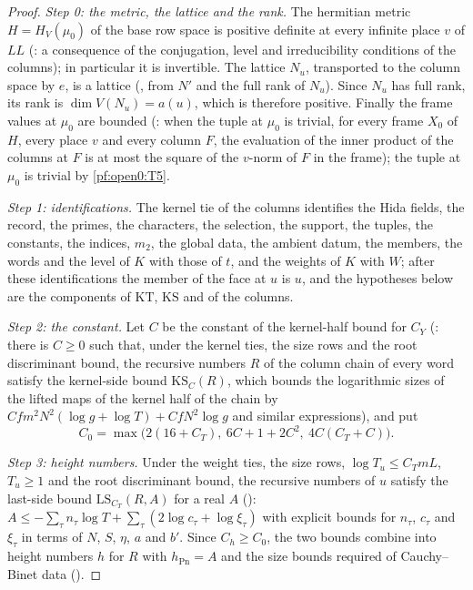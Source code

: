 \begin{proof}
\emph{Step 0: the metric, the lattice and the rank.} The hermitian metric $H=H_V(\mu_0)$ of the base row space is positive
definite at every infinite place $v$ of $\mathit{LL}$ (: a consequence of the
conjugation, level and irreducibility conditions of the columns); in particular it is invertible. The lattice $N_u$, transported
to the column space by $e$, is a lattice (, from $N'$ and the full rank of
$N_u$). Since $N_u$ has full rank, its rank is $\dim V(N_u)=a(u)$, which is therefore positive. Finally the frame values at $\mu_0$ are
bounded (: when the tuple at $\mu_0$ is trivial, for every frame $X_0$ of $H$,
every place $v$ and every column $F$, the evaluation of the inner product of the columns at $F$ is at most the square of the
$v$-norm of $F$ in the frame); the tuple at $\mu_0$ is trivial by \ref{pf:open0:T5}.

\emph{Step 1: identifications.} The kernel tie of the columns identifies the Hida fields, the record, the primes, the characters,
the selection, the support, the tuples, the constants, the indices, $m_2$, the global data, the ambient datum, the members, the
words and the level of $K$ with those of $t$, and the weights of $K$ with $W$; after these identifications the member of the face
at $u$ is $u$, and the hypotheses below are the components of $\mathrm{KT}$, $\mathrm{KS}$ and of the columns.

\emph{Step 2: the constant.} Let $C$ be the constant of the kernel-half bound for $C_Y$
(: there is $C\ge0$ such that, under the kernel ties, the size rows
and the root discriminant bound, the recursive numbers $R$ of the column chain of every word satisfy the kernel-side bound
$\mathrm{KS}_C(R)$, which bounds the logarithmic sizes of the lifted maps of the kernel half of the chain by
$Cfm^2N^2(\log g+\log T)+CfN^2\log g$ and similar expressions), and put
\[
C_0=\max\bigl(2(16+C_T),\ 6C+1+2C^2,\ 4C(C_T+C)\bigr).
\]

\emph{Step 3: height numbers.} Under the weight ties, the size rows, $\log T_u\le C_TmL$, $T_u\ge1$ and the root discriminant bound,
the recursive numbers of $u$ satisfy the last-side bound $\mathrm{LS}_{C_T}(R,A)$ for a real $A$
(): $A\le-\sum_\tau n_\tau\log T+\sum_\tau(2\log c_\tau+\log\xi_\tau)$
with explicit bounds for $n_\tau$, $c_\tau$ and $\xi_\tau$ in terms of $N$, $S$, $\eta$, $a$ and $b'$. Since $C_h\ge C_0$, the two bounds
combine into height numbers $h$ for $R$ with $h_{\mathrm{Pn}}=A$ and the size bounds required of Cauchy--Binet data
().


\end{proof}
